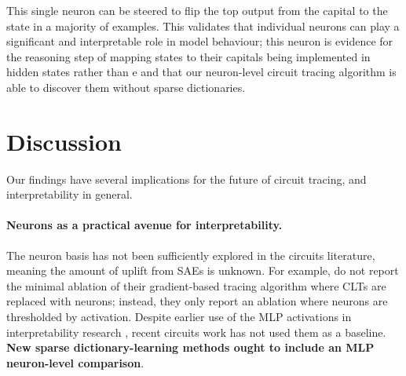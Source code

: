 \documentclass{article}
\theoremstyle{plain}
\theoremstyle{definition}
\theoremstyle{remark}
\begin{document}
This single neuron can be steered to flip the top output from the capital to the state in a majority of examples.
This validates that individual neurons can play a significant and interpretable role in model behaviour; this neuron is evidence for the reasoning step of mapping states to their capitals being implemented in hidden states rather than e and that our neuron-level circuit tracing algorithm is able to discover them without sparse dictionaries.


\section{Discussion}

Our findings have several implications for the future of circuit tracing, and interpretability in general.

\paragraph{Neurons as a practical avenue for interpretability.} The neuron basis has not been sufficiently explored in the circuits literature, meaning the amount of uplift from SAEs is unknown. For example, \citet{ameisen2025circuit} do not report the minimal ablation of their gradient-based tracing algorithm where CLTs are replaced with neurons; instead, they only report an ablation where neurons are thresholded by activation.
Despite earlier use of the MLP activations in interpretability research \citep{bricken2023towards,gurnee2023finding}, recent circuits work has not used them as a baseline. \textbf{New sparse dictionary-learning methods ought to include an MLP neuron-level comparison}.
\end{document}

